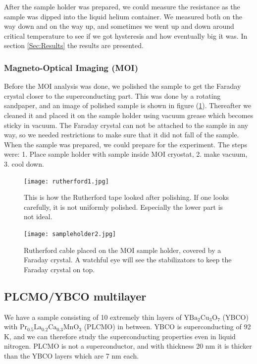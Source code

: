 \documentclass{comjnl}
\newcommand*\chem[1]{\ensuremath{\mathrm{#1}}}
\begin{document}
After the sample holder was prepared, we could measure the resistance as the sample was dipped into the liquid helium container. We measured both on the way down and on the way up, and sometimes we went up and down around critical temperature to see if we got hysteresis and how eventually big it was. In section \ref{Sec:Results} the results are presented.

\subsubsection{Magneto-Optical Imaging (MOI)}
Before the MOI analysis was done, we polished the sample to get the Faraday crystal closer to the superconducting part. This was done by a rotating sandpaper, and an image of polished sample is shown in figure (\ref{fig:rutherford1}). Thereafter we cleaned it and placed it on the sample holder using vacuum grease which becomes sticky in vacuum. The Faraday crystal can not be attached to the sample in any way, so we needed restrictions to make sure that it did not fall of the sample. When the sample was prepared, we could prepare for the experiment. The steps were: 1. Place sample holder with sample inside MOI cryostat, 2. make vacuum, 3. cool down. 
\begin{figure}[h]
\centering
\texttt{[image: rutherford1.jpg]}
\caption{This is how the Rutherford tape looked after polishing. If one looks carefully, it is not uniformly polished. Especially the lower part is not ideal. \label{fig:rutherford1}}
\end{figure}
\begin{figure}[h]
\centering
\texttt{[image: sampleholder2.jpg]}
\caption{Rutherford cable placed on the MOI sample holder, covered by a Faraday crystal. A watchful eye will see the stabilizators to keep the Faraday crystal on top. \label{fig:sampleholder2}}
\end{figure}

\subsection{PLCMO/YBCO multilayer}
We have a sample consisting of 10 extremely thin layers of \chem{YBa_2Cu_3O_7} (YBCO) with \chem{Pr_{0.5}La_{0.2}Ca_{0.3}MnO_3} (PLCMO) in between. YBCO is superconducting of 92 K, and we can therefore study the superconducting properties even in liquid nitrogen. PLCMO is not a superconductor, and with thickness 20 nm it is thicker than the YBCO layers which are 7 nm each. 
\end{document}
